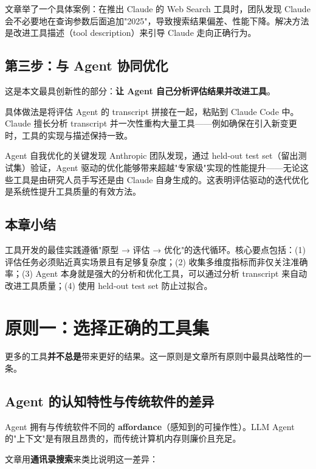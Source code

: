 \documentclass[a4paper]{article}
\begin{document}
文章举了一个具体案例：在推出 Claude 的 Web Search 工具时，团队发现 Claude 会不必要地在查询参数后面追加"2025"，导致搜索结果偏差、性能下降。解决方法是改进工具描述（tool description）来引导 Claude 走向正确行为。

\subsection{第三步：与 Agent 协同优化}

这是本文最具创新性的部分：\textbf{让 Agent 自己分析评估结果并改进工具}。

具体做法是将评估 Agent 的 transcript 拼接在一起，粘贴到 Claude Code 中。Claude 擅长分析 transcript 并一次性重构大量工具——例如确保在引入新变更时，工具的实现与描述保持一致。

\begin{importantbox}{Agent 自我优化的关键发现}
Anthropic 团队发现，通过 held-out test set（留出测试集）验证，Agent 驱动的优化能够带来超越"专家级"实现的性能提升——无论这些工具是由研究人员手写还是由 Claude 自身生成的。这表明评估驱动的迭代优化是系统性提升工具质量的有效方法。
\end{importantbox}

\subsection{本章小结}

工具开发的最佳实践遵循"原型 → 评估 → 优化"的迭代循环。核心要点包括：(1) 评估任务必须贴近真实场景且有足够复杂度；(2) 收集多维度指标而非仅关注准确率；(3) Agent 本身就是强大的分析和优化工具，可以通过分析 transcript 来自动改进工具质量；(4) 使用 held-out test set 防止过拟合。


\section{原则一：选择正确的工具集}

更多的工具\textbf{并不总是}带来更好的结果。这一原则是文章所有原则中最具战略性的一条。

\subsection{Agent 的认知特性与传统软件的差异}

Agent 拥有与传统软件不同的 \textbf{affordance}（感知到的可操作性）。LLM Agent 的"上下文"是有限且昂贵的，而传统计算机内存则廉价且充足。

文章用\textbf{通讯录搜索}来类比说明这一差异：
\end{document}
